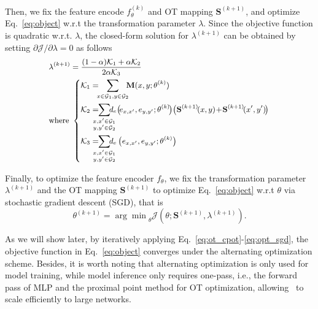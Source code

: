 Then, we fix the feature encode $f_\theta^{(k)}$ and OT mapping $\mathbf{S}^{(k+1)}$, and optimize Eq.~\eqref{eq:object} w.r.t the transformation parameter $\lambda$. Since the objective function is quadratic w.r.t. $\lambda$, the closed-form solution for $\lambda^{(k+1)}$ can be obtained by setting $\partial\mathcal{J}/\partial{\lambda}=0$ as follows
\begin{equation}\label{eq:opt_lambda}
    \small
    \begin{aligned}
    &\lambda^{(k+1)}=\frac{(1-\alpha)\mathcal{K}_1 +\alpha\mathcal{K}_2}{2\alpha\mathcal{K}_3}\\
    &\text{where }\left\{
        \begin{aligned}
            &\mathcal{K}_1=\bignegspace\sum_{x\in\G_1,y\in\G_2}\bignegspace\mathbf{M}(x,y;\theta^{(k)})\\
            &\mathcal{K}_2=\bignegspace\bignegspace\sum\limits_{\substack{x,x'\in\G_1\\y,y'\in\G_2}} \bignegspace\bignegspace d_e\!\left(\!e_{x,x'},e_{y,y'};\theta^{(k)}\!\right)\!\left(\mathbf{S}^{(k+1)}\!(x,y)\!+\!\mathbf{S}^{(k+1)}\!(x',y')\!\right)\\
            &\mathcal{K}_3=\bignegspace\bignegspace\sum\limits_{\substack{x,x'\in\G_1\\y,y'\in\G_2}} \bignegspace\bignegspace d_e\left(e_{x,x'},e_{y,y'};\theta^{(k)}\right)\\
        \end{aligned}
        \right.
    \end{aligned}
\end{equation}

Finally, to optimize the feature encoder $f_\theta$, we fix the transformation parameter $\lambda^{(k+1)}$ and the OT mapping $\mathbf{S}^{(k+1)}$ to optimize Eq.~\eqref{eq:object} w.r.t $\theta$ via stochastic gradient descent (SGD), that is
\begin{equation}\label{eq:opt_sgd}
    \theta^{(k+1)}={\arg\min}_{\theta}\mathcal{J}(\theta;\mathbf{S}^{(k+1)},\lambda^{(k+1)}).
\end{equation}

As we will show later, by iteratively applying Eq.~\eqref{eq:ot_cpot}-\eqref{eq:opt_sgd}, the objective function in Eq.~\eqref{eq:object} converges under the alternating optimization scheme.
Besides, it is worth noting that alternating optimization is only used for model training, while model inference only requires one-pass, i.e., the forward pass of MLP and the proximal point method for OT optimization, allowing \algname\ to scale efficiently to large networks.

